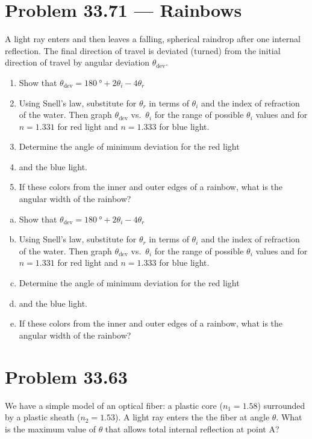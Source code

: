 \documentclass[12pt]{article}
\begin{document}
\section*{Problem 33.71 --- Rainbows}
A light ray enters and then leaves a falling, spherical raindrop after one internal reflection.  The final direction of travel is deviated (turned) from the initial direction of travel by angular deviation $\theta_\text{dev}$.
\begin{enumerate}
	\item Show that $\theta_\text{dev}=\SI{180}{\degree}+2\theta_i-4\theta_r$
    \item Using Snell's law, substitute for $\theta_r$ in terms of $\theta_i$ and the index of refraction of the water.  Then graph $\theta_\text{dev}$ vs.~$\theta_i$ for the range of possible $\theta_i$ values and for $n=1.331$ for red light and $n=1.333$ for blue light.
    \item Determine the angle of minimum deviation for the red light
    \item and the blue light.
    \item If these colors from the inner and outer edges of a rainbow, what is the angular width of the rainbow?
\end{enumerate}
\begin{enumerate}[(a)]
	\item Show that $\theta_\text{dev}=\SI{180}{\degree}+2\theta_i-4\theta_r$
    \item Using Snell's law, substitute for $\theta_r$ in terms of $\theta_i$ and the index of refraction of the water.  Then graph $\theta_\text{dev}$ vs.~$\theta_i$ for the range of possible $\theta_i$ values and for $n=1.331$ for red light and $n=1.333$ for blue light.
    \item Determine the angle of minimum deviation for the red light
    \item and the blue light.
    \item If these colors from the inner and outer edges of a rainbow, what is the angular width of the rainbow?
\end{enumerate}



\section*{Problem 33.63}
We have a simple model of an optical fiber: a plastic core ($n_1=1.58$) surrounded by a plastic sheath ($n_2=1.53$).  A light ray enters the the fiber at angle $\theta$.  What is the maximum value of $\theta$ that allows total internal reflection at point A?
\end{document}
